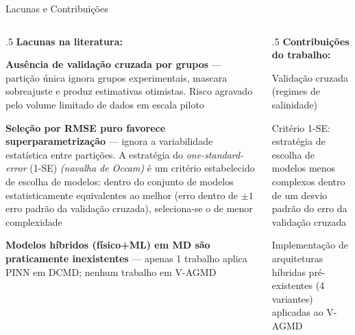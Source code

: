 \begin{slide}{Lacunas e Contribuições}
  \scriptsize
  \begin{columns}
    \begin{column}{.5\linewidth}
      \textbf{Lacunas na literatura:}
      \begin{Item}
        \item[\textbf{1.}] \textbf{Ausência de validação cruzada por grupos} --- partição única ignora grupos experimentais, mascara sobreajuste e produz estimativas otimistas. Risco agravado pelo volume limitado de dados em escala piloto \cite{Vabalas2019}
        \item[\textbf{2.}] \textbf{Seleção por RMSE puro favorece superparametrização} --- ignora a variabilidade estatística entre partições. A estratégia do \textit{one-standard-error} (1-SE) \cite{Hastie2009, Yates2022} \textit{(navalha de Occam)} é um critério estabelecido de escolha de modelos: dentro do conjunto de modelos estatisticamente equivalentes ao melhor (erro dentro de $\pm 1$ erro padrão da validação cruzada), seleciona-se o de menor complexidade
        \item[\textbf{3.}] \textbf{Modelos híbridos (físico+ML) em MD são praticamente inexistentes} --- apenas 1 trabalho aplica PINN em DCMD; nenhum trabalho em V-AGMD
      \end{Item}
    \end{column}
    \begin{column}{.5\linewidth}
      \textbf{Contribuições do trabalho:}
      \begin{Item}
        \item Validação cruzada (regimes de salinidade)
        \item Critério 1-SE: estratégia de escolha de modelos menos complexos dentro de um desvio padrão do erro da validação cruzada \cite{Hastie2009ESL}
        \item Implementação de arquiteturas híbridas pré-existentes \cite{Rai2020} (4 variantes) aplicadas ao V-AGMD
      \end{Item}
    \end{column}
  \end{columns}
  \vfill
\end{slide}
